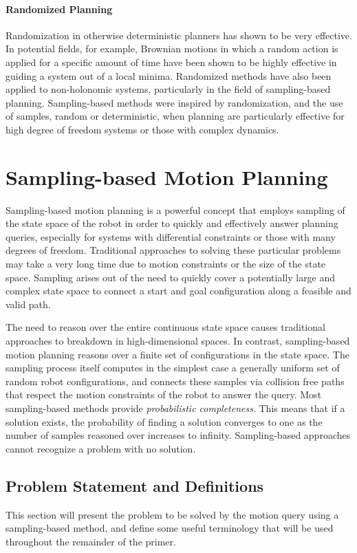 \paragraph {Randomized Planning}
Randomization in otherwise deterministic planners has shown to be very
effective.  In potential fields, for example, Brownian motions in which a random
action is applied for a specific amount of time have been shown to be highly
effective in guiding a system out of a local minima.  Randomized methods have
also been applied to non-holonomic systems, particularly in the field of
sampling-based planning.  Sampling-based methods were inspired by randomization,
and the use of samples, random or deterministic, when planning are particularly
effective for high degree of freedom systems or those with complex dynamics.

\section {Sampling-based Motion Planning}
\label {sect:samplingbasedplanning}
Sampling-based motion planning is a powerful concept that employs sampling of
the state space of the robot in order to quickly and effectively answer planning
queries, especially for systems with differential constraints or those with
many degrees of freedom.  Traditional approaches to solving these particular
problems may take a very long time due to motion constraints or the size of the
state space.  Sampling arises out of the need to quickly cover a potentially
large and complex state space to connect a start and goal configuration along a
feasible and valid path.

The need to reason over the entire continuous state space causes traditional
approaches to breakdown in high-dimensional spaces.  In contrast, sampling-based
motion planning reasons over a finite set of configurations in the state space.
The sampling process itself computes in the simplest case a generally uniform
set of random robot configurations, and connects these samples via collision
free paths that respect the motion constraints of the robot to answer the query.
Most sampling-based methods provide {\it probabilistic completeness}.  This
means that if a solution exists, the probability of finding a solution converges
to one as the number of samples reasoned over increases to infinity.
Sampling-based approaches cannot recognize a problem with no solution.

\subsection {Problem Statement and Definitions}
This section will present the problem to be solved by the motion query using
a sampling-based method, and define some useful terminology that will be used
throughout the remainder of the primer.

